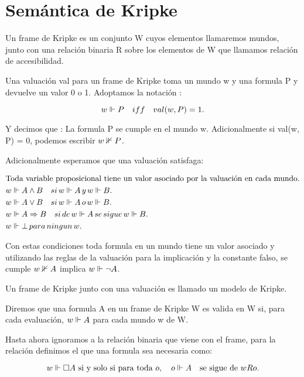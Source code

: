 \section{Semántica de Kripke}

Un frame de Kripke es un conjunto W cuyos elementos llamaremos mundos, junto con una relación binaria R sobre los elementos de W que llamamos relación de accesibilidad. 

Una valuación val para un frame de Kripke toma un mundo w y una formula P y devuelve un valor 0 o 1. Adoptamos la notación :

\begin{equation*}
  w \Vdash P \quad iff \quad val(w,P)=1.
\end{equation*}

Y decimos que : La formula P se cumple en el mundo w. Adicionalmente si val(w, P) = 0, podemos escribir $w \nVdash P$.

Adicionalmente esperamos que una valuación satisfaga:

\begin{align*}
  &\text{Toda variable proposicional tiene un valor asociado por la valuación en cada mundo}. \\
  &w \Vdash A \land B \quad si \, w \Vdash A \, y \, w \Vdash B. \\
  &w \Vdash A \lor B \quad si \, w \Vdash A \, o \, w \Vdash B. \\
  &w \Vdash A \Rightarrow B \quad si \, de \, w \Vdash A \, se \, sigue \, w \Vdash B. \\
  &w \Vdash \bot \, para \, ningun \, w. 
\end{align*}


Con estas condiciones toda formula en un mundo tiene un valor asociado y utilizando las reglas de la valuación para la implicación y la constante falso, se cumple $w \nVdash A$ implica $w \Vdash \neg A$.

Un frame de Kripke junto con una valuación es llamado un modelo de Kripke.

Diremos que una formula A en un frame de Kripke W es valida en W si, para cada evaluación, $w \Vdash A$  para cada mundo w de W.

Hasta ahora ignoramos a la relación binaria que viene con el frame, para la relación definimos el que una formula sea necesaria como:

\begin{equation*}
  w \Vdash \square A \text{ si y solo si para toda } o, \quad o \Vdash A \quad \text{se sigue de } wRo.
\end{equation*}

